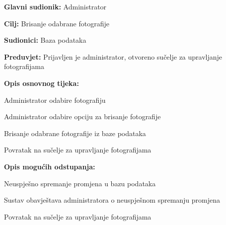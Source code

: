 					\noindent {}
					\begin{packed_item}
						
						\item \textbf{Glavni sudionik: }Administrator
						\item  \textbf{Cilj:} Brisanje odabrane fotografije
						\item  \textbf{Sudionici:} Baza podataka
						\item  \textbf{Preduvjet:} Prijavljen je administrator, otvoreno sučelje za upravljanje fotografijama
						\item  \textbf{Opis osnovnog tijeka:}
						
						\item[] \begin{packed_enum}
							
							\item Administrator odabire fotografiju
							\item Administrator odabire opciju za brisanje fotografije
							\item Brisanje odabrane fotografije iz baze podataka
							\item Povratak na sučelje za upravljanje fotografijama
						\end{packed_enum}
						
						\item  \textbf{Opis mogućih odstupanja:}
						
						\item[] \begin{packed_item}
							
							\item[4.a] Neuspješno spremanje promjena u bazu podataka
							\item[] \begin{packed_enum}
								
								\item Sustav obavještava administratora o neuspješnom spremanju promjena
								\item Povratak na sučelje za upravljanje fotografijama
								
							\end{packed_enum}
							
						\end{packed_item}
					\end{packed_item}
					
